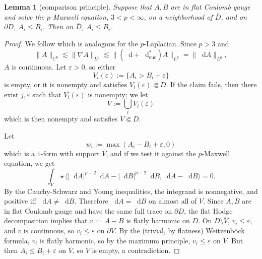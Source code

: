 \documentclass[reqno,11pt]{amsart}
\newcommand*\dif{\mathop{}\!\mathrm{d}}
\newcommand{\euc}{\mathrm{euc}}
\newtheorem{lemma}[theorem]{Lemma}
\theoremstyle{definition}
\numberwithin{equation}{section}
\begin{document}
\begin{lemma}[comparison principle]
Suppose that $A, B$ are in flat Coulomb gauge and solve the $p$-Maxwell equation, $3 < p < \infty$, on a neighborhood of $\overline D$, and on $\partial D$, $A_i \leq B_i$.
Then on $\overline D$, $A_i \leq B_i$.
\end{lemma}
\begin{proof}
We follow \cite[Theorem 2.15]{lindqvist2019notes} which is analogous for the $p$-Laplacian.
Since $p > 3$ and
$$\|A\|_{C^0} \lesssim \|\nabla A\|_{L^p} \lesssim \|(\dif + \dif_\euc^*) A\|_{L^p} = \|\dif A\|_{L^p},$$
$A$ is continuous.
Let $\varepsilon > 0$, so either
$$V_i(\varepsilon) := \{A_i > B_i + \varepsilon\}$$
is empty, or it is nonempty and satisfies $V_i(\varepsilon) \Subset D$.
If the claim fails, then there exist $j, \varepsilon$ such that $V_i(\varepsilon)$ is nonempty; we let 
$$V := \bigcup_i V_i(\varepsilon)$$
which is then nonempty and satisfies $V \Subset D$. 

Let
$$w_i := \max(A_i - B_i + \varepsilon, 0)$$
which is a $1$-form with support $\overline V$, and if we test it against the $p$-Maxwell equation, we get
$$\int_V \star \langle |\dif A|^{p - 2} \dif A - |\dif B|^{p - 2} \dif B, \dif A - \dif B\rangle = 0.$$
By the Cauchy-Schwarz and Young inequalities, the integrand is nonnegative, and positive iff $\dif A \neq \dif B$.
Therefore $\dif A = \dif B$ on almost all of $V$.
Since $A, B$ are in flat Coulomb gauge and have the same full trace on $\partial D$, the flat Hodge decomposition implies that $v := A - B$ is flatly harmonic on $D$.
On $D \setminus \overline V$, $v_i \leq \varepsilon$, and $v$ is continuous, so $v_i \leq \varepsilon$ on $\partial V$.
By the (trivial, by flatness) Weitzenb\"ock formula, $v_i$ is flatly harmonic, so by the maximum principle, $v_i \leq \varepsilon$ on $\overline V$.
But then $A_i \leq B_i + \varepsilon$ on $\overline V$, so $V$ is empty, a contradiction.
\end{proof}
\end{document}
